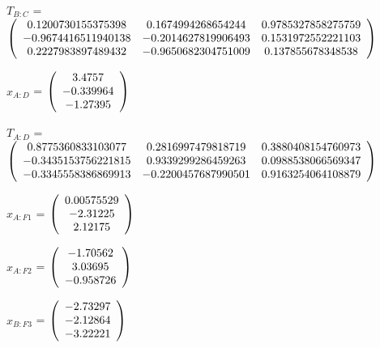 \begin{description}
$T_{B:C}$ = $\left( \begin{array} {ccc}
   0.1200730155375398 & 0.1674994268654244 & 0.9785327858275759 \\
   -0.9674416511940138 & -0.2014627819906493 & 0.1531972552221103 \\
   0.2227983897489432 & -0.9650682304751009 & 0.137855678348538 \\
\end{array} \right)\\ \\$

$x_{A:D}$ = $\left( \begin{array} {ccc}     3.4757 \\  -0.339964 \\   -1.27395
\end{array} \right)\\ \\$

$T_{A:D}$ = $\left( \begin{array} {ccc}
   0.8775360833103077 & 0.2816997479818719 & 0.3880408154760973 \\
   -0.3435153756221815 & 0.9339299286459263 & 0.0988538066569347 \\
   -0.3345558386869913 & -0.2200457687990501 & 0.9163254064108879 \\
\end{array} \right)\\ \\$

$x_{A:F1}$ = $\left( \begin{array} {ccc} 0.00575529 \\   -2.31225 \\    2.12175
\end{array} \right)\\ \\$

$x_{A:F2}$ = $\left( \begin{array} {ccc}   -1.70562 \\    3.03695 \\  -0.958726
\end{array} \right)\\ \\$

$x_{B:F3}$ = $\left( \begin{array} {ccc}   -2.73297 \\   -2.12864 \\   -3.22221
\end{array} \right)\\ \\$


\end{description}
